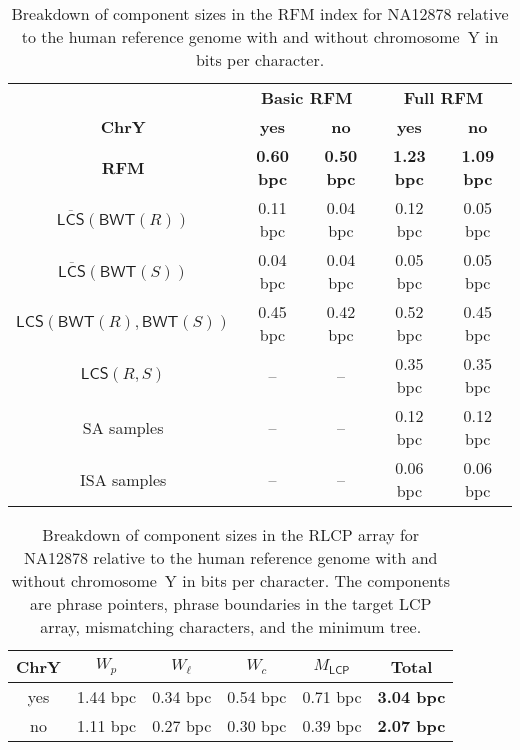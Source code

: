 \documentclass[a4paper,11pt]{llncs}
\renewcommand{\complement}[1]{\ensuremath{\overline{ #1 }}}
\newcommand{\SA}{\textsf{SA}}
\newcommand{\ISA}{\textsf{ISA}}
\newcommand{\RFM}{\textsf{RFM}}
\newcommand{\mBWT}{\ensuremath{\mathsf{BWT}}}
\newcommand{\LCP}{\textsf{LCP}}
\newcommand{\RLCP}{\textsf{RLCP}}
\newcommand{\mLCP}{\ensuremath{\mathsf{LCP}}}
\newcommand{\mLCS}{\ensuremath{\mathsf{LCS}}}
\newcommand{\mCS}{\ensuremath{\complement{\mathsf{LCS}}}}
\begin{document}
\begin{table}
\caption{Breakdown of component sizes in the \RFM{} index for NA12878 relative to the human reference genome with and without chromosome~Y in bits per character.}\label{table:rfm components}
\setlength{\extrarowheight}{2pt}
\setlength{\tabcolsep}{3pt}
\begin{center}
\begin{tabular}{c|cc|cc}
\hline
 & \multicolumn{2}{c|}{\textbf{Basic \RFM}} & \multicolumn{2}{c}{\textbf{Full \RFM}} \\
\textbf{ChrY} & \textbf{yes} & \textbf{no} & \textbf{yes} & \textbf{no} \\
\hline
\textbf{\RFM}              & \textbf{0.60 bpc} & \textbf{0.50 bpc} & \textbf{1.23 bpc} & \textbf{1.09 bpc} \\
$\mCS(\mBWT(R))$           &          0.11 bpc &          0.04 bpc &          0.12 bpc &          0.05 bpc \\
$\mCS(\mBWT(S))$           &          0.04 bpc &          0.04 bpc &          0.05 bpc &          0.05 bpc \\
$\mLCS(\mBWT(R),\mBWT(S))$ &          0.45 bpc &          0.42 bpc &          0.52 bpc &          0.45 bpc \\
$\mLCS(R,S)$               &                -- &                -- &          0.35 bpc &          0.35 bpc \\
\SA{} samples              &                -- &                -- &          0.12 bpc &          0.12 bpc \\
\ISA{} samples             &                -- &                -- &          0.06 bpc &          0.06 bpc \\
\hline
\end{tabular}
\end{center}
\end{table}

\begin{table}
\caption{Breakdown of component sizes in the \RLCP{} array for NA12878 relative to the human reference genome with and without chromosome~Y in bits per character. The components are phrase pointers, phrase boundaries in the target \LCP{} array, mismatching characters, and the minimum tree.}\label{table:rlcp components}
\setlength{\extrarowheight}{2pt}
\setlength{\tabcolsep}{3pt}
\begin{center}
\begin{tabular}{c|cccc|c}
\hline
\textbf{ChrY} & $W_{p}$  & $W_{\ell}$ & $W_{c}$  & $M_{\mLCP}$ & \textbf{Total}    \\
\hline
yes           & 1.44 bpc &   0.34 bpc & 0.54 bpc &    0.71 bpc & \textbf{3.04 bpc} \\
no            & 1.11 bpc &   0.27 bpc & 0.30 bpc &    0.39 bpc & \textbf{2.07 bpc} \\
\hline
\end{tabular}
\end{center}
\end{table}
\end{document}
